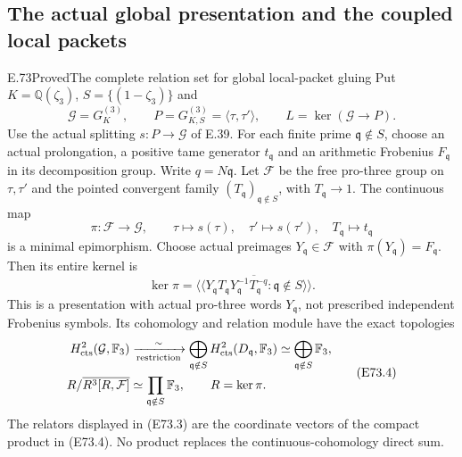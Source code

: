 \subsection{The actual global presentation and the coupled local packets}

\begin{statement}{E.73}{Proved}{The complete relation set for global local-packet gluing}
Put $K=\mathbb Q(\zeta_3)$, $S=\{(1-\zeta_3)\}$ and
\[
 \mathcal G=G_K^{(3)},\qquad
 P=G_{K,S}^{(3)}=\langle\tau,\tau'\rangle,
 \qquad L=\ker(\mathcal G\to P).
 \tag{E73.1}
\]
Use the actual splitting $s:P\to\mathcal G$ of E.39.
For each finite prime $\mathfrak q\notin S$, choose an actual
prolongation, a positive tame generator $t_{\mathfrak q}$ and
an arithmetic Frobenius $F_{\mathfrak q}$ in its decomposition
group. Write $q=N\mathfrak q$. Let $\mathcal F$ be the free
pro-three group on $\tau,\tau'$ and the pointed convergent
family $(T_{\mathfrak q})_{\mathfrak q\notin S}$, with
$T_{\mathfrak q}\to1$. The continuous map
\[
 \pi:\mathcal F\longrightarrow\mathcal G,
 \qquad \tau\mapsto s(\tau),\quad
 \tau'\mapsto s(\tau'),\quad T_{\mathfrak q}\mapsto t_{\mathfrak q}
 \tag{E73.2}
\]
is a minimal epimorphism. Choose actual preimages
$Y_{\mathfrak q}\in\mathcal F$ with
$\pi(Y_{\mathfrak q})=F_{\mathfrak q}$. Then its entire kernel is
\[
 \ker\pi=
 \overline{\langle\!\langle
   Y_{\mathfrak q}T_{\mathfrak q}Y_{\mathfrak q}^{-1}
        T_{\mathfrak q}^{-q}:\mathfrak q\notin S
 \rangle\!\rangle}.
 \tag{E73.3}
\]
This is a presentation with actual pro-three words
$Y_{\mathfrak q}$, not prescribed independent Frobenius symbols.
Its cohomology and relation module have the exact topologies
\[
 \begin{split}
 H^2_{\rm cts}(\mathcal G,\mathbb F_3)
   &\xrightarrow[\mathrm{restriction}]{\ \sim\ }
      \bigoplus_{\mathfrak q\notin S}
              H^2_{\rm cts}(D_{\mathfrak q},\mathbb F_3)
      \simeq\bigoplus_{\mathfrak q\notin S}\mathbb F_3,\\
 R/\overline{R^3[R,\mathcal F]}
   &\simeq\prod_{\mathfrak q\notin S}\mathbb F_3,
       \qquad R=\ker\pi.
 \end{split}
 \tag{E73.4}
\]
The relators displayed in (E73.3) are the coordinate vectors
of the compact product in (E73.4). No product replaces
the continuous-cohomology direct sum.


\end{statement}
